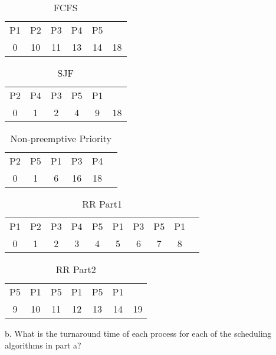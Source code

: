 \documentclass[letterpaper, 10pt,DIV=13]{scrartcl}
\numberwithin{equation}{section} %
\numberwithin{figure}{section} %
\numberwithin{table}{section} %
\begin{document}
\begin{table}[h]
    \centering
    \begin{tabular}{cccccc}
        P1 & P2 & P3 & P4 & P5 & \\
        0  &10  & 11 &  13&  14&18 \\
    \end{tabular}
    \caption{FCFS}
    \label{tab:my_label}
\end{table}
\begin{table}[h]
    \centering
    \begin{tabular}{cccccc}
        P2 & P4 & P3 & P5 & P1 & \\
        0 & 1 & 2 & 4 & 9 & 18\\
    \end{tabular}
    \caption{SJF}
    \label{tab:my_label}
\end{table}
\begin{table}[H]
    \centering
    \begin{tabular}{cccccc}
        P2 & P5 & P1 & P3 & P4 \\
        0 & 1 & 6 & 16 &  18\\
    \end{tabular}
    \caption{Non-preemptive Priority}
    \label{tab:my_label}
\end{table}

\begin{table}[H]
    \centering
    \begin{tabular}{cccccccccc}
         P1&  P2&  P3&  P4&  P5&  P1&  P3&  P5&  P1& \\
         0&  1&  2&  3& 4 &  5&  6& 7 &  8& \\
    \end{tabular}
    \caption{RR Part1}
    \label{tab:my_label}
\end{table}
\begin{table}[H]
    \centering
    \begin{tabular}{ccccccc}
         P5& P1&  P5&  P1&  P5&  P1& \\
         9& 10 &11  &12  &13  &14  &19 \\
    \end{tabular}
    \caption{RR Part2}
    \label{tab:my_label}
\end{table}
\pagebreak
b. What is the turnaround time of each process for each of the scheduling algorithms in part a? \\
\end{document}
